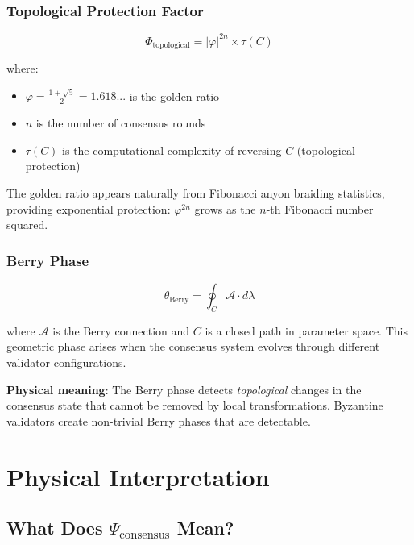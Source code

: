 \documentclass[11pt,a4paper,twoside]{article}
\begin{document}
\subsubsection{Topological Protection Factor}

\begin{equation}
\Phi_{\text{topological}} = |\varphi|^{2n} \times \tau(C)
\end{equation}

where:
\begin{itemize}
    \item $\varphi = \frac{1+\sqrt{5}}{2} = 1.618...$ is the golden ratio
    \item $n$ is the number of consensus rounds
    \item $\tau(C)$ is the computational complexity of reversing $C$ (topological protection)
\end{itemize}

The golden ratio appears naturally from Fibonacci anyon braiding statistics, providing exponential protection: $\varphi^{2n}$ grows as the $n$-th Fibonacci number squared.

\subsubsection{Berry Phase}

\begin{equation}
\theta_{\text{Berry}} = \oint_C \mathcal{A} \cdot d\lambda
\end{equation}

where $\mathcal{A}$ is the Berry connection and $C$ is a closed path in parameter space. This geometric phase arises when the consensus system evolves through different validator configurations.

\textbf{Physical meaning}: The Berry phase detects \textit{topological} changes in the consensus state that cannot be removed by local transformations. Byzantine validators create non-trivial Berry phases that are detectable.

\newpage

\section{Physical Interpretation}

\subsection{What Does $\Psi_{\text{consensus}}$ Mean?}
\end{document}
